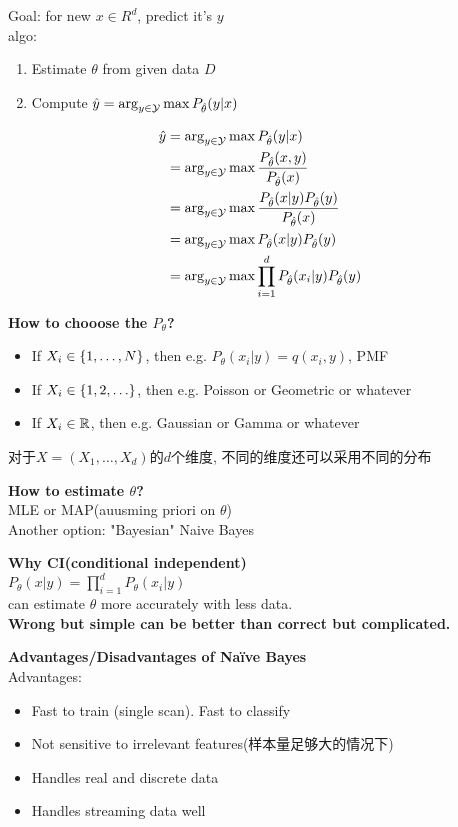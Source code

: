 \documentclass{article}
\begin{document}
Goal: for new $x \in R^d$, predict it's $y$\\
algo: 
\begin{enumerate}
\item Estimate $\theta$ from given data $D$
\item Compute $\hat{y} = \arg_{y \in \mathcal{Y}} \max P_{\hat{\theta}}(y|x)$
\end{enumerate}

$$
\begin{aligned}
\hat{y} 
& = \arg_{y \in \mathcal{Y}} \max P_{\hat{\theta}}(y|x) \\
& = \arg_{y \in \mathcal{Y}} \max \dfrac{P_{\hat{\theta}} (x,y)}{ P_{\hat{\theta}}(x) } \\
& = \arg_{y \in \mathcal{Y}} \max \dfrac{P_{\hat{\theta}} (x|y) P_{\hat{\theta}}(y)}{ P_{\hat{\theta}}(x) } \\
& = \arg_{y \in \mathcal{Y}} \max P_{\hat{\theta}} (x|y) P_{\hat{\theta}}(y) \\
& = \arg_{y \in \mathcal{Y}} \max \prod_{i=1}^d P_{\hat{\theta}} (x_i|y) P_{\hat{\theta}}(y) \\
\end{aligned}
$$

\textbf{How to chooose the $P_\theta$?}
\begin{itemize}
\item If $X_i \in \{1,\ldots, N\}$, then e.g. $P_\theta(x_i |y) = q(x_i, y)$, PMF
\item If $X_i \in \{1, 2, \ldots\}$, then e.g. Poisson or Geometric or whatever
\item If $X_i \in \mathbb{R}$, then e.g. Gaussian or Gamma or whatever
\end{itemize}
对于$X=(X_1, \ldots, X_d)$的$d$个维度, 不同的维度还可以采用不同的分布

\textbf{How to estimate $\theta$?}\\
MLE or MAP(auusming priori on $\theta$)\\
Another option: "Bayesian" Naive Bayes

\textbf{Why CI(conditional independent)}\\
$P_\theta(x|y) = \prod_{i=1}^d P_\theta(x_i|y)$\\
can estimate $\theta$ more accurately with less data.\\
\textbf{Wrong but simple can be better than correct but complicated.}

\bigskip
\textbf{Advantages/Disadvantages of Na\"ive Bayes}\\
Advantages:
\begin{itemize}
\item Fast to train (single scan). Fast to classify 
\item Not sensitive to irrelevant features(样本量足够大的情况下)
\item Handles real and discrete data
\item Handles streaming data well
\end{itemize}
\end{document}
